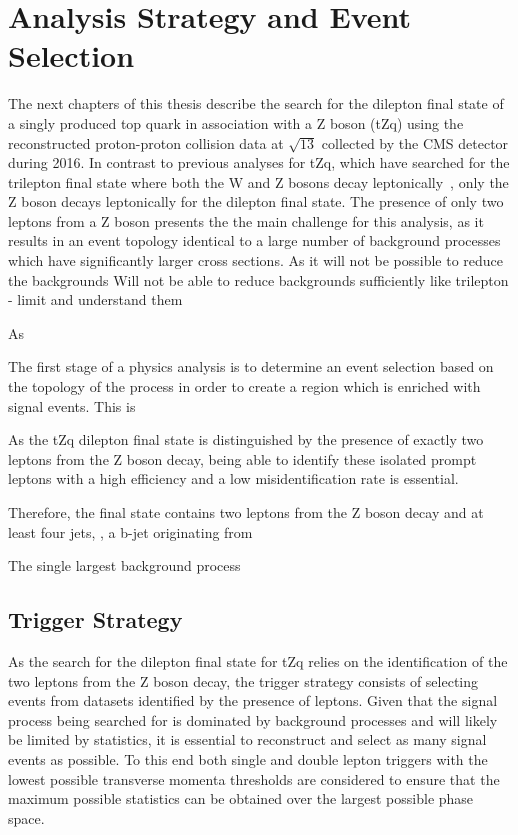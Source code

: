 \chapter{Analysis Strategy and Event Selection}\label{chapter:tzq-search}
The next chapters of this thesis describe the search for the dilepton final state of a singly produced top quark in association with a Z boson (tZq) using the reconstructed proton-proton collision data at $\sqrt{13}$ collected by the CMS detector during 2016.
In contrast to previous analyses for tZq, which have searched for the trilepton final state where both the W and Z bosons decay leptonically~\cite{Sirunyan:2017kkr,Sirunyan:2017nbr}, only the Z boson decays leptonically for the dilepton final state.
The presence of only two leptons from a Z boson presents the the main challenge for this analysis, as it results in an event topology identical to a large number of background processes which have significantly larger cross sections.
As it will not be possible to reduce the backgrounds
Will not be able to reduce backgrounds sufficiently like trilepton - limit and understand them

As 

The first stage of a	 physics analysis is to determine an event selection based on the topology of the process in order to create a region which is enriched with signal events.
This is 



As the tZq dilepton final state is distinguished by the presence of exactly two leptons from the Z boson decay, being able to identify these isolated prompt leptons with a high efficiency and a low misidentification rate is essential.

Therefore, the final state contains two leptons from the Z boson decay and at least four jets, 
, a b-jet originating from 


The single largest background process 


\section{Trigger Strategy}\label{sec:triggerStrategy}
As the search for the dilepton final state for tZq relies on the identification of the two leptons from the Z boson decay, the trigger strategy consists of selecting events from datasets identified by the presence of leptons.
Given that the signal process being searched for is dominated by background processes and will likely be limited by statistics, it is essential to reconstruct and select as many signal events as possible.
To this end both single and double lepton triggers with the lowest possible transverse momenta thresholds are considered 
to ensure that the maximum possible statistics can be obtained over the largest possible phase space.

